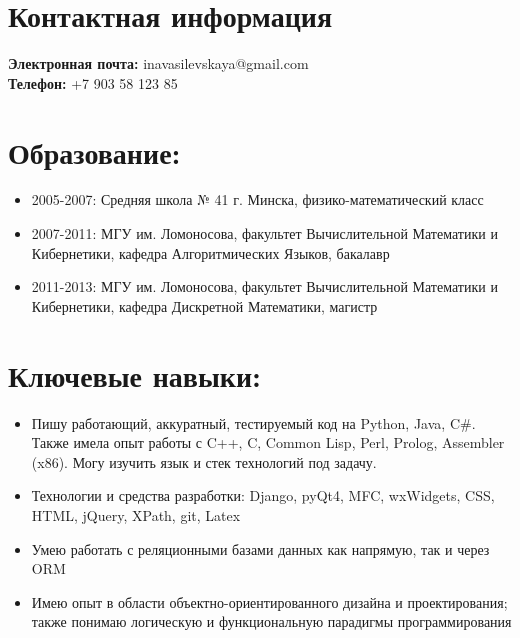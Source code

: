\documentclass{res}
\begin{document}
    \begin{resume}
        \section{Контактная информация}
        {\bf Электронная почта:} inavasilevskaya@gmail.com \\
        {\bf Телефон:} +7 903 58 123 85\\
        \section{Образование:}
        \begin{itemize}
            \item 2005-2007: Средняя школа № 41 г. Минска, 
                физико-математический класс
            \item 2007-2011: МГУ им. Ломоносова, факультет
              Вычислительной Математики и Кибернетики, кафедра
              Алгоритмических Языков, бакалавр
           \item 2011-2013: МГУ им. Ломоносова, факультет
               Вычислительной Математики и Кибернетики, кафедра
               Дискретной Математики, магистр
        \end{itemize}

        \section{Ключевые навыки:}
        \begin{itemize}
            \item Пишу работающий, аккуратный, тестируемый код на Python, Java, C\#.
              Также имела опыт работы с C++, C, Common Lisp, Perl, Prolog, Assembler (x86). 
              Могу изучить язык и стек технологий под задачу.
              
            \item Технологии и средства разработки: Django, pyQt4, MFC, wxWidgets,
                CSS, HTML, jQuery, XPath, git, Latex 

            \item Умею работать с реляционными базами данных как напрямую, так и через ORM

            \item Имею опыт в области объектно-ориентированного дизайна и проектирования; 
                также понимаю логическую и функциональную парадигмы программирования


\end{itemize}
\end{resume}
\end{document}
